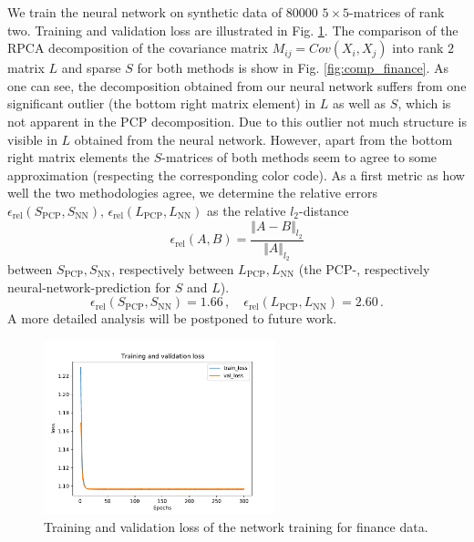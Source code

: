 We train the neural network on synthetic data of 80000 $5\times 5$-matrices of rank two. Training and validation loss are illustrated in Fig. \ref{fig:finance_training}. The comparison of the RPCA decomposition of the covariance matrix $M_{ij} = Cov(X_i,X_j)$ into rank $2$ matrix $L$ and sparse $S$ for both methods is show in Fig. \ref{fig:comp_finance}. As one can see, the decomposition obtained from our neural network suffers from one significant outlier (the bottom right matrix element) in $L$ as well as $S$, which is not apparent in the PCP decomposition. Due to this outlier not much structure is visible in $L$ obtained from the neural network. However, apart from the bottom right matrix elements the $S$-matrices of both methods seem to agree to some approximation (respecting the corresponding color code). As a first metric as how well the two methodologies agree, we determine the relative errors $\epsilon_\text{rel} (S_\text{PCP}, S_\text{NN}),\, \epsilon_\text{rel} (L_\text{PCP}, L_\text{NN})$ as the relative $l_2$-distance
\begin{equation}
\epsilon_\text{rel}(A,B) = \frac{\Vert A - B \Vert_{l_2}}{\Vert A \Vert_{l_2}}
\end{equation}
between $S_\text{PCP}, S_\text{NN}$, respectively between $L_\text{PCP}, L_\text{NN}$ (the PCP-, respectively neural-network-prediction for $S$ and $L$).
\begin{equation}
\epsilon_\text{rel}(S_\text{PCP},S_\text{NN}) = 1.66\,, \quad  \epsilon_\text{rel}(L_\text{PCP},L_\text{NN}) = 2.60 \,.
\end{equation}
A more detailed analysis will be postponed to future work.
\begin{figure}
	\centering
	\includegraphics[width=0.6\textwidth]{fig/loss_finance.pdf}
	\caption{Training and validation loss of the network training for finance data.}
	\label{fig:finance_training}
\end{figure}

